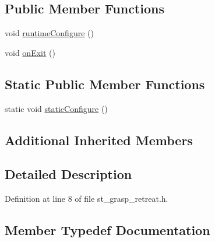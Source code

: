 \subsection*{Public Member Functions}
\begin{DoxyCompactItemize}
\item 
void \hyperlink{structsm__moveit__4_1_1pick__states_1_1StGraspRetreat_a2d386f511e377a4b0eb8193cd24ddb84}{runtime\+Configure} ()
\item 
void \hyperlink{structsm__moveit__4_1_1pick__states_1_1StGraspRetreat_aba04f694c6c7c664a0c6a6e10c8ce0f1}{on\+Exit} ()
\end{DoxyCompactItemize}
\subsection*{Static Public Member Functions}
\begin{DoxyCompactItemize}
\item 
static void \hyperlink{structsm__moveit__4_1_1pick__states_1_1StGraspRetreat_a678250d9b3296956f285a2bc27af6641}{static\+Configure} ()
\end{DoxyCompactItemize}
\subsection*{Additional Inherited Members}


\subsection{Detailed Description}


Definition at line 8 of file st\+\_\+grasp\+\_\+retreat.\+h.



\subsection{Member Typedef Documentation}
\mbox{\label{structsm__moveit__4_1_1pick__states_1_1StGraspRetreat_aad4cc2d348387279c746f628b8f6da38}} 
